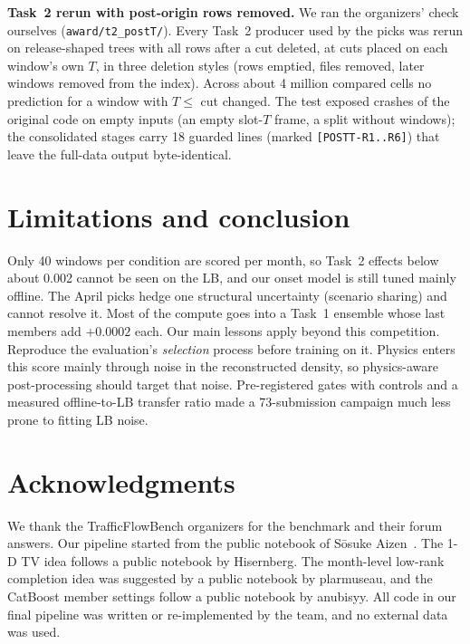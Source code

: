 \documentclass[conference,10pt]{IEEEtran}
\newcommand{\file}[1]{\texttt{\small #1}}
\begin{document}
\textbf{Task~2 rerun with post-origin rows removed.} We ran the organizers' check ourselves (\file{award/t2\_postT/}). Every Task~2
producer used by the picks was rerun on release-shaped trees with all rows after a cut deleted, at cuts placed on each window's own $T$,
in three deletion styles (rows emptied, files removed, later windows removed from the index). Across about 4 million compared cells no
prediction for a window with $T\le$ cut changed. The test exposed crashes of the original code on empty inputs (an empty slot-$T$ frame, a
split without windows); the consolidated stages carry 18 guarded lines (marked \texttt{[POSTT-R1..R6]}) that leave the full-data output
byte-identical.

\section{Limitations and conclusion}
Only 40 windows per condition are scored per month, so Task~2 effects below about 0.002 cannot be seen on the LB, and our onset
model is still tuned mainly offline. The April picks hedge one structural uncertainty (scenario sharing) and cannot resolve it. Most of the
compute goes into a Task~1 ensemble whose last members add $+0.0002$ each. Our main lessons apply beyond this competition.
Reproduce the evaluation's \emph{selection} process before training on it. Physics enters this score mainly through noise in the reconstructed
density, so physics-aware post-processing should target that noise. Pre-registered gates with controls and a measured offline-to-LB transfer ratio
made a 73-submission campaign much less prone to fitting LB noise.

\section*{Acknowledgments}
We thank the TrafficFlowBench organizers for the benchmark and their forum answers. Our pipeline started from the public notebook of
S\=osuke Aizen~\cite{soukeaizenz}. The 1-D TV idea follows a public notebook by Hisernberg. The month-level low-rank completion
idea was suggested by a public notebook by plarmuseau, and the CatBoost member settings follow a public notebook by anubisyy. All code in our
final pipeline was written or re-implemented by the team, and no external data was used.
\end{document}
